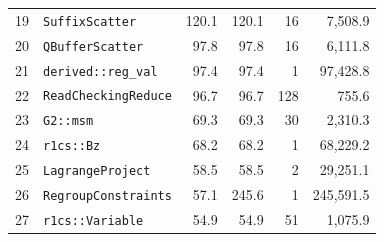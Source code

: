 \documentclass[10pt,a4paper]{article}
\begin{document}
\begin{longtable}{r l r r r r}
19 & \texttt{SuffixScatter} & 120.1 & 120.1 & 16 & 7,508.9 \\
20 & \texttt{QBufferScatter} & 97.8 & 97.8 & 16 & 6,111.8 \\
21 & \texttt{derived::reg\_val} & 97.4 & 97.4 & 1 & 97,428.8 \\
22 & \texttt{ReadCheckingReduce} & 96.7 & 96.7 & 128 & 755.6 \\
23 & \texttt{G2::msm} & 69.3 & 69.3 & 30 & 2,310.3 \\
24 & \texttt{r1cs::Bz} & 68.2 & 68.2 & 1 & 68,229.2 \\
25 & \texttt{LagrangeProject} & 58.5 & 58.5 & 2 & 29,251.1 \\
26 & \texttt{RegroupConstraints} & 57.1 & 245.6 & 1 & 245,591.5 \\
27 & \texttt{r1cs::Variable} & 54.9 & 54.9 & 51 & 1,075.9 \\
\bottomrule \end{longtable}
\end{document}
